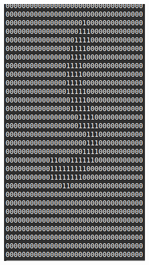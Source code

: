 \begin{figure}[htbp]
\begin{subfigure}[b]{0.2\linewidth}
		\includegraphics[width=1\linewidth]{pics/wrong_output_predict5_2.png}
		\label{fig:sub5}
	\end{subfigure}
	
	\label{تشخیص‌های اشتباه شبکه}
\end{figure}


